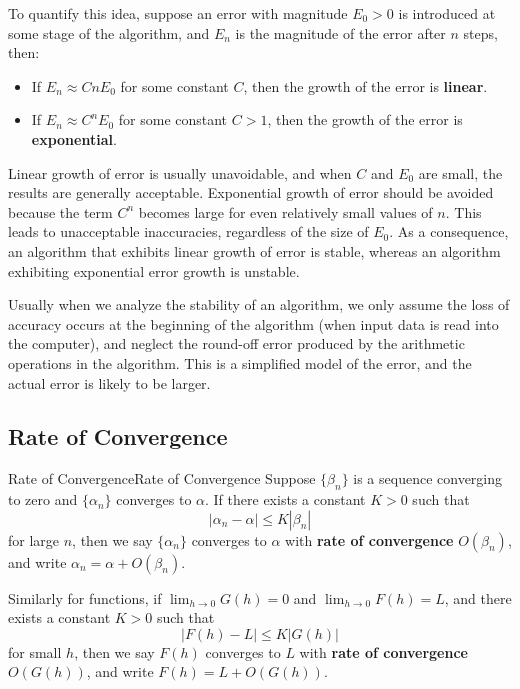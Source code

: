 \documentclass[../main.tex]{subfiles}
\begin{document}
To quantify this idea, suppose an error with magnitude $E_0 > 0$ is introduced at some stage of the algorithm, and $E_n$ is the magnitude of the error after $n$ steps, then:
\begin{itemize}
  \item If $E_n \approx C n E_0$ for some constant $C$, then the growth of the error is \textbf{linear}.
  \item If $E_n \approx C^n E_0$ for some constant $C > 1$, then the growth of the error is \textbf{exponential}.
\end{itemize}

Linear growth of error is usually unavoidable, and when $C$ and $E_0$ are small, the results are generally acceptable. Exponential growth of error should be avoided because the term $C^n$ becomes large for even relatively small values of $n$. This leads to unacceptable inaccuracies, regardless of the size of $E_0$. As a consequence, an algorithm that exhibits linear growth of error is stable, whereas an algorithm exhibiting exponential error growth is unstable.

\begin{remark}
  Usually when we analyze the stability of an algorithm, we only assume the loss of accuracy occurs at the beginning of the algorithm (when input data is read into the computer), and neglect the round-off error produced by the arithmetic operations in the algorithm. This is a simplified model of the error, and the actual error is likely to be larger.
\end{remark}

\subsection{Rate of Convergence}

\begin{definition}{Rate of Convergence}{Rate of Convergence}
  Suppose $\{\beta_n\}$ is a sequence converging to zero and $\{\alpha_n\}$ converges to $\alpha$. If there exists a constant $K > 0$ such that
  \begin{equation*}
    |\alpha_n - \alpha| \leq K |\beta_n|
  \end{equation*}
  for large $n$, then we say $\{\alpha_n\}$ converges to $\alpha$ with \textbf{rate of convergence} $O(\beta_n)$, and write $\alpha_n = \alpha + O(\beta_n)$.

  Similarly for functions, if $\lim_{h \to 0} G(h) = 0$ and $\lim_{h \to 0} F(h) = L$, and there exists a constant $K > 0$ such that
  \begin{equation*}
    |F(h) - L| \leq K |G(h)|
  \end{equation*}
  for small $h$, then we say $F(h)$ converges to $L$ with \textbf{rate of convergence} $O(G(h))$, and write $F(h) = L + O(G(h))$.
\end{definition}
\end{document}
